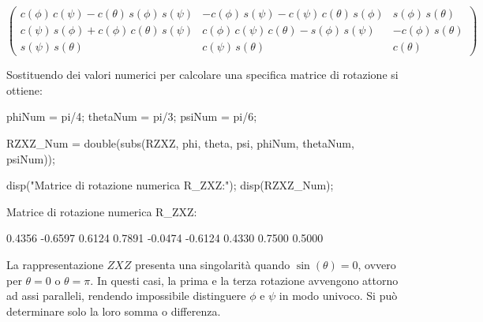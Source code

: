 \documentclass[11pt, a4paper]{article}
\begin{document}
\[
\begin{pmatrix}
c\left(\phi \right)\,c\left(\psi \right)-c\left(\theta \right)\,s \left(\phi \right)\,s \left(\psi \right) & -c\left(\phi \right)\,s \left(\psi \right)-c\left(\psi \right)\,c\left(\theta \right)\,s \left(\phi \right) & s \left(\phi \right)\,s \left(\theta \right)\\
c\left(\psi \right)\,s \left(\phi \right)+c\left(\phi \right)\,c\left(\theta \right)\,s \left(\psi \right) & c\left(\phi \right)\,c\left(\psi \right)\,c\left(\theta \right)-s \left(\phi \right)\,s \left(\psi \right) & -c\left(\phi \right)\,s \left(\theta \right)\\
s \left(\psi \right)\,s \left(\theta \right) & c\left(\psi \right)\,s \left(\theta \right) & c\left(\theta \right)
\end{pmatrix}
\]


\begin{par}
\begin{flushleft}
Sostituendo dei valori numerici per calcolare una specifica matrice di rotazione si ottiene:
\end{flushleft}
\end{par}

\begin{matlabcode}
phiNum = pi/4;   %
thetaNum = pi/3; %
psiNum = pi/6;   %

RZXZ_Num = double(subs(RZXZ, {phi, theta, psi}, {phiNum, thetaNum, psiNum}));

disp("Matrice di rotazione numerica R_ZXZ:");
disp(RZXZ_Num);
\end{matlabcode}
\begin{matlaboutput}
Matrice di rotazione numerica R_ZXZ:
\end{matlaboutput}
\begin{matlaboutput}
    0.4356   -0.6597    0.6124
    0.7891   -0.0474   -0.6124
    0.4330    0.7500    0.5000
\end{matlaboutput}


\begin{par}
\begin{flushleft}
La rappresentazione $ZXZ$ presenta una singolarità quando $\sin(\theta )=0$, ovvero per $\theta =0$ o $\theta =\pi$. In questi casi, la prima e la terza rotazione avvengono attorno ad assi paralleli, rendendo impossibile distinguere $\phi$ e $\psi$ in modo univoco. Si può determinare solo la loro somma o differenza.
\end{flushleft}
\end{par}
\end{document}
